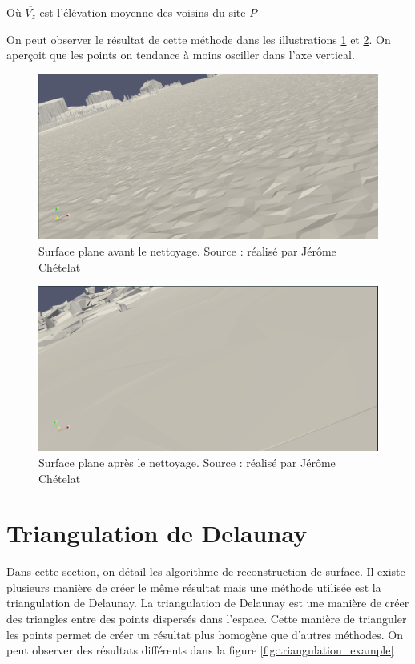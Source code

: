 Où $\overline{V_z}$ est l'élévation moyenne des voisins du site $P$

On peut observer le résultat de cette méthode dans les illustrations \ref{fig:before_las_filter} et
\ref{fig:after_las_filter}.
On aperçoit que les points on tendance à moins osciller dans l'axe vertical.

\begin{figure}[htbp!]
    \centering
    \includegraphics[width=0.8\linewidth]{figures/lissage_brut.png}
    \caption{Surface plane avant le nettoyage. Source : réalisé par Jérôme Chételat}
    \label{fig:before_las_filter}
\end{figure}
\begin{figure}[htbp!]
    \centering
    \includegraphics[width=0.8\linewidth]{figures/lissage_filtrer.png}
    \caption{Surface plane après le nettoyage. Source : réalisé par Jérôme Chételat}
    \label{fig:after_las_filter}
\end{figure}

\section{Triangulation de Delaunay}
Dans cette section, on détail les algorithme de reconstruction de surface.
Il existe plusieurs manière de créer le même résultat mais une méthode utilisée est la triangulation de Delaunay.
La triangulation de Delaunay est une manière de créer des triangles entre des points dispersés dans l’espace.
Cette manière de trianguler les points permet de créer un résultat plus homogène que d’autres méthodes.
On peut observer des résultats différents dans la figure
\ref{fig:triangulation_example}

